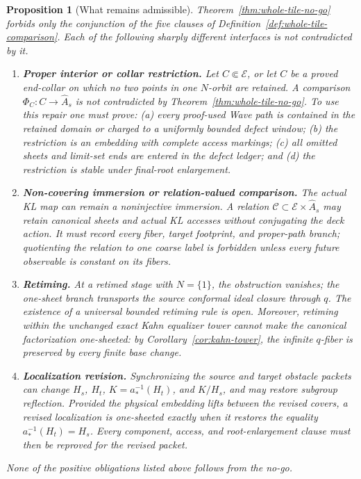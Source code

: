 \documentclass[11pt,reqno]{amsart}
\newtheorem{proposition}[theorem]{Proposition}
\theoremstyle{definition}
\theoremstyle{remark}
\begin{document}
\begin{proposition}[What remains admissible]\label{prop:admissible}
Theorem~\ref{thm:whole-tile-no-go} forbids only the conjunction of the five clauses of Definition~\ref{def:whole-tile-comparison}.  Each of the following sharply different interfaces is not contradicted by it.
\begin{enumerate}
\item \textbf{Proper interior or collar restriction.}  Let \(C\Subset\mathcal E\), or let \(C\) be a proved end-collar on which no two points in one \(N\)-orbit are retained.  A comparison \(\Phi_C\colon C\to\widehat A_s\) is not contradicted by Theorem~\ref{thm:whole-tile-no-go}.  To use this repair one must prove: (a) every proof-used Wave path is contained in the retained domain or charged to a uniformly bounded defect window; (b) the restriction is an embedding with complete access markings; (c) all omitted sheets and limit-set ends are entered in the defect ledger; and (d) the restriction is stable under final-root enlargement.
\item \textbf{Non-covering immersion or relation-valued comparison.}  The actual KL map can remain a noninjective immersion.  A relation \(\mathcal C\subset\mathcal E\times\widehat A_s\) may retain canonical sheets and actual KL accesses without conjugating the deck action.  It must record every fiber, target footprint, and proper-path branch; quotienting the relation to one coarse label is forbidden unless every future observable is constant on its fibers.
\item \textbf{Retiming.}  At a retimed stage with \(N=\{1\}\), the obstruction vanishes; the one-sheet branch transports the source conformal ideal closure through \(q\).  The existence of a universal bounded retiming rule is open.  Moreover, retiming \emph{within the unchanged exact Kahn equalizer tower} cannot make the canonical factorization one-sheeted: by Corollary~\ref{cor:kahn-tower}, the infinite \(q\)-fiber is preserved by every finite base change.
\item \textbf{Localization revision.}  Synchronizing the source and target obstacle packets can change \(H_s\), \(H_t\), \(K=a_*^{-1}(H_t)\), and \(K/H_s\), and may restore subgroup reflection.  Provided the physical embedding lifts between the revised covers, a revised localization is one-sheeted exactly when it restores the equality \(a_*^{-1}(H_t)=H_s\).  Every component, access, and root-enlargement clause must then be reproved for the revised packet.
\end{enumerate}
None of the positive obligations listed above follows from the no-go.
\end{proposition}
\end{document}
